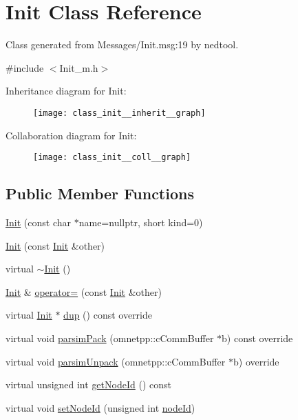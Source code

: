 \hypertarget{class_init}{}\section{Init Class Reference}
\label{class_init}


Class generated from {\ttfamily Messages/\+Init.\+msg\+:19} by nedtool.  




{\ttfamily \#include $<$Init\+\_\+m.\+h$>$}



Inheritance diagram for Init\+:\nopagebreak
\begin{figure}[H]
\begin{center}
\leavevmode
\texttt{[image: class\_init\_\_inherit\_\_graph]}
\end{center}
\end{figure}


Collaboration diagram for Init\+:\nopagebreak
\begin{figure}[H]
\begin{center}
\leavevmode
\texttt{[image: class\_init\_\_coll\_\_graph]}
\end{center}
\end{figure}
\subsection*{Public Member Functions}
\begin{DoxyCompactItemize}
\item 
\hyperlink{class_init_a763a386107f8ea21acfd24f243e0f73c}{Init} (const char $\ast$name=nullptr, short kind=0)
\item 
\hyperlink{class_init_a9d26400c5fabf20571808ad773524669}{Init} (const \hyperlink{class_init}{Init} \&other)
\item 
virtual \hyperlink{class_init_a67d5c94cb965fa3b774e969cfb4969d1}{$\sim$\+Init} ()
\item 
\hyperlink{class_init}{Init} \& \hyperlink{class_init_ab995dd231981ed97018c00b5fd8e9797}{operator=} (const \hyperlink{class_init}{Init} \&other)
\item 
virtual \hyperlink{class_init}{Init} $\ast$ \hyperlink{class_init_ad1e6c6b247eae6eaac5dd8e9dc9cdce0}{dup} () const override
\item 
virtual void \hyperlink{class_init_a73df5d54ec41b9980e98dbfc12875145}{parsim\+Pack} (omnetpp\+::c\+Comm\+Buffer $\ast$b) const override
\item 
virtual void \hyperlink{class_init_ab3728913400c516dbb31c8fed392d32d}{parsim\+Unpack} (omnetpp\+::c\+Comm\+Buffer $\ast$b) override
\item 
virtual unsigned int \hyperlink{class_init_a67fdac2389d7298a742e33a6551e8eb1}{get\+Node\+Id} () const
\item 
virtual void \hyperlink{class_init_a21b64722ff60f3ecf3b17939c0a1cb6d}{set\+Node\+Id} (unsigned int \hyperlink{class_init_abc9fcf6151621f0ac808cd29e14239c9}{node\+Id})
\end{DoxyCompactItemize}
